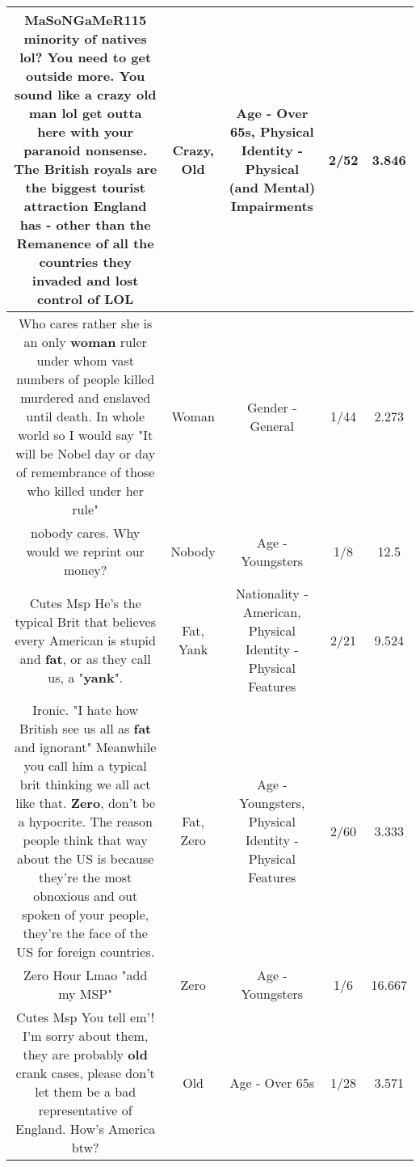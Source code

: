 \documentclass[11pt]{article}
\newlength\mylength
\begin{document}
\begin{center}
\begin{longtable}{|C{.65\mylength}|C{.30\mylength}|C{.12\mylength}|C{.12\mylength}|C{.12\mylength}|}
  \small MaSoNGaMeR115 minority of natives lol? You need to get outside more. You sound like a \textbf{crazy} \textbf{old} man lol get outta here with your paranoid nonsense. The British royals are the biggest tourist attraction England has - other than the Remanence of all the countries they invaded and lost control of LOL\normalsize   & Crazy, Old & Age - Over 65s, Physical Identity - Physical (and Mental) Impairments & 2/52 & 3.846 \\  \hline
  \small Who cares rather she is an only \textbf{woman} ruler under whom vast numbers of people killed murdered and enslaved until death. In whole world so I would say "It will be Nobel day or day of remembrance of those who killed under her rule"\normalsize   & Woman & Gender - General & 1/44 & 2.273 \\  \hline
  \small nobody cares. Why would we reprint our money?\normalsize   & Nobody & Age - Youngsters & 1/8 & 12.5 \\  \hline
  \small Cutes Msp He's the typical Brit that believes every American is stupid and \textbf{fat}, or as they call us, a "\textbf{yank}".\normalsize   & Fat, Yank & Nationality - American, Physical Identity - Physical Features & 2/21 & 9.524 \\  \hline
  \small Ironic. "I hate how British see us all as \textbf{fat} and ignorant" Meanwhile you call him a typical brit thinking we all act like that. \textbf{Zero}, don't be a hypocrite. The reason people think that way about the US is because they're the most obnoxious and out spoken of your people, they're the face of the US for foreign countries.\normalsize   & Fat, Zero & Age - Youngsters, Physical Identity - Physical Features & 2/60 & 3.333 \\  \hline
  \small Zero Hour Lmao "add my MSP"\normalsize   & Zero & Age - Youngsters & 1/6 & 16.667 \\  \hline
  \small Cutes Msp You tell em'! I'm sorry about them, they are probably \textbf{old} crank cases, please don't let them be a bad representative of England. How's America btw?\normalsize   & Old & Age - Over 65s & 1/28 & 3.571 \\  \hline

\end{longtable}
\end{center}
\end{document}
